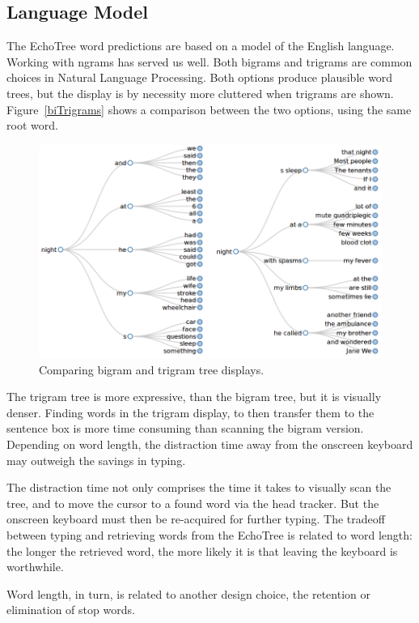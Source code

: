 \documentclass{sigchi}
\begin{document}
\subsection{Language Model}
The EchoTree word predictions are based on a model of the English
language. Working with ngrams has served us well. Both bigrams and
trigrams are common choices in Natural Language Processing. Both
options produce plausible word trees, but the display is by necessity
more cluttered when trigrams are shown. Figure~\ref{biTrigrams} shows
a comparison between the two options, using the same root word.
\begin{figure}
   \centering
   \includegraphics[width=\columnwidth]{Figs/biAndTrigrams.png}
   \caption{Comparing bigram and trigram tree displays.}
   \label{fig:biTrigrams}
\end{figure}
The trigram tree is more expressive, than the bigram tree, but it is
visually denser. Finding words in the trigram display, to then transfer
them to the sentence box is more time consuming than scanning the bigram
version. Depending on word length, the distraction time away from the
onscreen keyboard may outweigh the savings in typing.

The distraction time not only comprises the time it takes to visually
scan the tree, and to move the cursor to a found word via the head
tracker. But the onscreen keyboard must then be re-acquired for
further typing. The tradeoff between typing and retrieving words from the
EchoTree is related to word length: the longer the retrieved word, the
more likely it is that leaving the keyboard is worthwhile.

Word length, in turn, is related to another design choice, the
retention or elimination of stop words.
\end{document}

